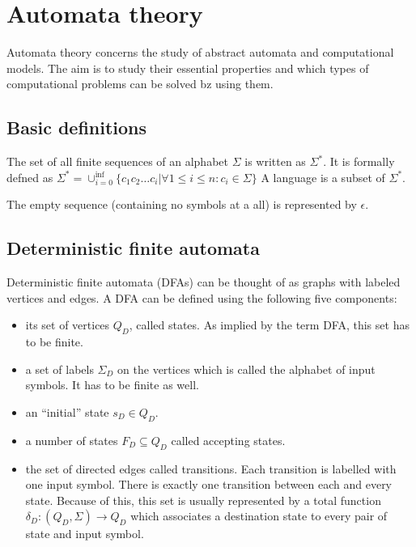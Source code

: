 \section{Automata theory}

Automata theory concerns the study of abstract automata and computational models.
The aim is to study their essential properties and which types of computational problems can be solved bz using them.

\subsection{Basic definitions}

\begin{definition}
    The set of all finite sequences of an alphabet $\Sigma$ is written as $\Sigma^\ast$.
    It is formally defned as
    $\Sigma^\ast = \cup_{i=0}^{\inf} \{c_1 c_2 \ldots c_i | \forall 1 \le i \le n: c_i \in \Sigma \} $
    A language is a subset of $\Sigma^\ast$.
\end{definition}

The empty sequence (containing no symbols at a all) is represented by $\epsilon$.

\subsection{Deterministic finite automata}

\begin{definition}
    Deterministic finite automata (DFAs) can be thought of as graphs with labeled vertices and edges.
    A DFA can be defined using the following five components:

    \begin{itemize}
        \item its set of vertices $Q_D$, called states. As implied by the term DFA, this set has to be finite.
        \item a set of labels $\Sigma_D$ on the vertices which is called the alphabet of input symbols.
        It has to be finite as well.
        \item an ``initial'' state $s_D \in Q_D$.
        \item a number of states $F_D \subseteq Q_D$ called accepting states.
        \item the set of directed edges called transitions.
        Each transition is labelled with one input symbol.
        There is exactly one transition between each and every state.
        Because of this, this set is usually represented by a total function $\delta_D : (Q_D, \Sigma) \rightarrow Q_D$ which
        associates a destination state to every pair of state and input symbol.
    \end{itemize}
\end{definition}

